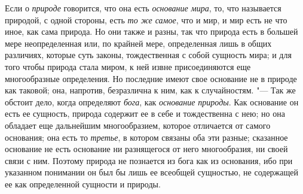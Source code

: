 Если о {\em природе} говорится, что она есть
{\em основание мира}, то, что называется природой, с
одной стороны, есть {\em то же самое}, что и мир, и мир
есть не что иное, как сама природа. Но они также и разны, так что природа
есть в большей мере неопределенная или, по крайней мере, определенная лишь
в общих различиях, которые суть законы, тождественная с собой сущность
мира; и для того чтобы природа стала миром, к ней извне присоединяются еще
многообразные определения. Но последние имеют свое основание не в природе
как таковой; она, напротив, безразлична к ним, как к случайностям. "--- Так же
обстоит дело, когда определяют {\em бога}, как
{\em основание природы}. Как основание он есть ее
сущность, природа содержит ее в себе и тождественна с нею; но она обладает
еще дальнейшим многообразием, которое отличается от самого основания; она
есть то {\em третье}, в котором связаны оба эти разные;
сказанное основание не есть основание ни разнящегося от него многообразия,
ни своей связи с ним. Поэтому природа не познается из бога как из
основания, ибо при указанном понимании он был бы лишь ее всеобщей
сущностью, не содержащей ее как определенной сущности и природы.


